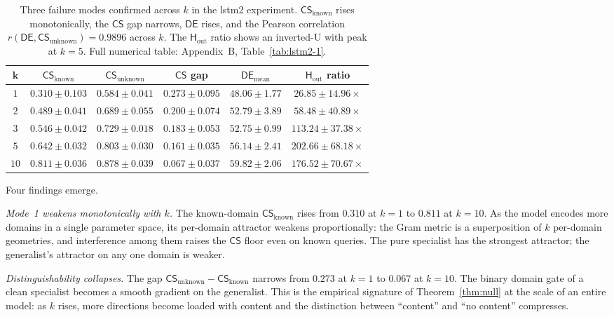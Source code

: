 \documentclass[11pt,a4paper]{article}
\newcommand{\CS}{\mathsf{CS}}
\newcommand{\DE}{\mathsf{DE}}
\newcommand{\Hout}{\mathsf{H}_{\mathrm{out}}}
\begin{document}
\begin{table}[H]
\centering
\caption{Three failure modes confirmed across $k$ in the lstm2 experiment. $\CS_{\mathrm{known}}$ rises monotonically, the $\CS$ gap narrows, $\DE$ rises, and the Pearson correlation $r(\DE, \CS_{\mathrm{unknown}}) = 0.9896$ across $k$. The $\Hout$ ratio shows an inverted-U with peak at $k = 5$. Full numerical table: Appendix~B, Table~\ref{tab:lstm2-1}.}
\label{tab:lstm2-1-main}
\renewcommand{\arraystretch}{1.25}
\vspace{4pt}
\begin{tabular}{c|ccccc}
\toprule
$\bm{k}$ & $\bm{\CS_{\mathrm{known}}}$ & $\bm{\CS_{\mathrm{unknown}}}$ &
$\bm{\CS}$\textbf{ gap} & $\bm{\DE_{\mathrm{mean}}}$ &
$\bm{\Hout}$\textbf{ ratio} \\
\midrule
$1$  & $0.310 \pm 0.103$ & $0.584 \pm 0.041$ & $0.273 \pm 0.095$ & $48.06 \pm 1.77$  & $26.85 \pm 14.96\times$ \\
$2$  & $0.489 \pm 0.041$ & $0.689 \pm 0.055$ & $0.200 \pm 0.074$ & $52.79 \pm 3.89$  & $58.48 \pm 40.89\times$ \\
$3$  & $0.546 \pm 0.042$ & $0.729 \pm 0.018$ & $0.183 \pm 0.053$ & $52.75 \pm 0.99$  & $113.24 \pm 37.38\times$ \\
$5$  & $0.642 \pm 0.032$ & $0.803 \pm 0.030$ & $0.161 \pm 0.035$ & $56.14 \pm 2.41$  & $\mathbf{202.66 \pm 68.18\times}$ \\
$10$ & $0.811 \pm 0.036$ & $0.878 \pm 0.039$ & $\mathbf{0.067 \pm 0.037}$ & $59.82 \pm 2.06$ & $176.52 \pm 70.67\times$ \\
\bottomrule
\end{tabular}
\end{table}

Four findings emerge.

\emph{Mode~1 weakens monotonically with $k$.} The known-domain $\CS_{\mathrm{known}}$ rises from $0.310$ at $k = 1$ to $0.811$ at $k = 10$. As the model encodes more domains in a single parameter space, its per-domain attractor weakens proportionally: the Gram metric is a superposition of $k$ per-domain geometries, and interference among them raises the $\CS$ floor even on known queries. The pure specialist has the strongest attractor; the generalist's attractor on any one domain is weaker.

\emph{Distinguishability collapses.} The gap $\CS_{\mathrm{unknown}} -
\CS_{\mathrm{known}}$ narrows from $0.273$ at $k = 1$ to $0.067$ at $k = 10$. The binary domain gate of a clean specialist becomes a smooth gradient on the generalist. This is the empirical signature of Theorem~\ref{thm:null} at the scale of an entire model: as $k$ rises, more directions become loaded with content and the distinction between ``content'' and ``no content'' compresses.
\end{document}
